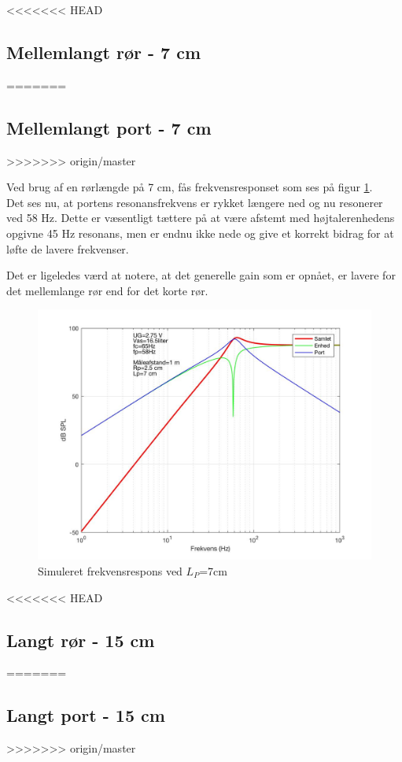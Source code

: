 <<<<<<< HEAD
\subsection{Mellemlangt rør - 7 cm}
=======
\subsection{Mellemlangt port - 7 cm}
>>>>>>> origin/master

Ved brug af en rørlængde på 7 cm, fås frekvensresponset som ses på figur \ref{fig:sim_medium}. \\
Det ses nu, at portens resonansfrekvens er rykket længere ned og nu resonerer ved 58 Hz. Dette er væsentligt tættere på at være afstemt med højtalerenhedens opgivne 45 Hz resonans, men er endnu ikke nede og give et korrekt bidrag for at løfte de lavere frekvenser. 

Det er ligeledes værd at notere, at det generelle gain som er opnået, er lavere for det mellemlange rør end for det korte rør.  

\begin{figure}[h!]
	\centering
	\includegraphics[width=.8\textwidth]{Pics/sim_medium}
	\caption{Simuleret frekvensrespons ved $L_P$=7cm } 
	\label{fig:sim_medium}
\end{figure}

<<<<<<< HEAD
\subsection{Langt rør - 15 cm}
=======
\subsection{Langt port - 15 cm}
>>>>>>> origin/master

